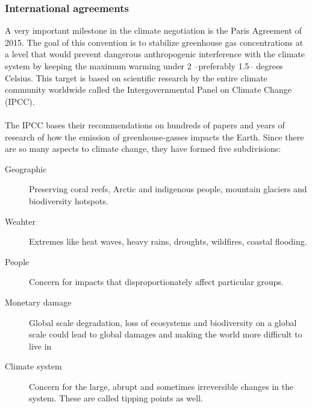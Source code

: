 \documentclass[../summary.tex]{subfiles}
\begin{document}
			\subsubsection{International agreements}
				A very important milestone in the climate negotiation is the Paris Agreement of 2015. The goal of this convention is to stabilize greenhouse gas concentrations at a level that would prevent dangerous anthropogenic interference with the climate system by keeping the maximum warming under 2 --preferably 1.5-- degrees Celsius. This target is based on scientific research by the entire climate community worldwide called the Intergovernmental Panel on Climate Change (IPCC).\\
				\\
				The IPCC bases their recommendations on hundreds of papers and years of research of how the emission of greenhouse-gasses impacts the Earth. Since there are so many aspects to climate change, they have formed five subdivisions:
				\begin{description}
					\item[Geographic] Preserving coral reefs, Arctic and indigenous people, mountain glaciers and biodiversity hotspots.
					\item[Weahter] Extremes like heat waves, heavy rains, droughts, wildfires, coastal flooding.
					\item[People] Concern for impacts that disproportionately affect particular groups.
					\item[Monetary damage]  Global scale degradation, loss of ecosystems and biodiversity on a global scale could lead to global damages and making the world more difficult to live in
					\item[Climate system] Concern for the large, abrupt and sometimes irreversible changes in the system. These are called tipping points as well.
				\end{description} 
			
			\newpage
\end{document}

